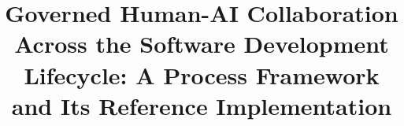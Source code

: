 %
%
\title{Governed Human-AI Collaboration Across the Software
Development Lifecycle: A Process Framework and Its Reference
Implementation}
